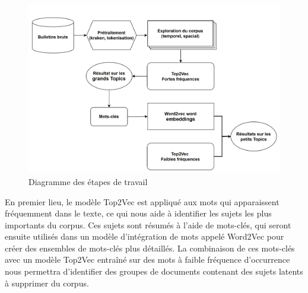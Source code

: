 \begin{figure}[H]
    \centering
    \includegraphics[width=1\linewidth]{img/1.2.diagram.PNG}
    \caption{Diagramme des étapes de travail}
    \label{fig:diagram}
\end{figure}


En premier lieu, le modèle Top2Vec est appliqué aux mots qui apparaissent fréquemment dans le texte, ce qui nous aide à identifier les sujets les plus importants du corpus. Ces sujets sont résumés à l'aide de mots-clés, qui seront ensuite utilisés dans un modèle d'intégration de mots appelé Word2Vec pour créer des ensembles de mots-clés plus détaillés. La combinaison de ces mots-clés avec un modèle Top2Vec entraîné sur des mots à faible fréquence d'occurrence nous permettra d'identifier des groupes de documents contenant des sujets latents à supprimer du corpus.

